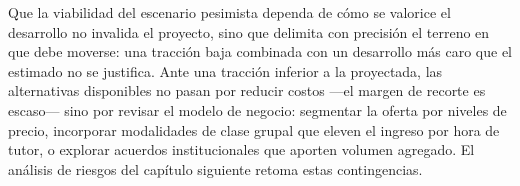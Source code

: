 Que la viabilidad del escenario pesimista dependa de cómo se valorice el
desarrollo no invalida el proyecto, sino que delimita con precisión el
terreno en que debe moverse: una tracción baja combinada con un
desarrollo más caro que el estimado no se justifica. Ante una
tracción inferior a la proyectada, las alternativas disponibles no pasan
por reducir costos —el margen de recorte es escaso— sino por revisar el
modelo de negocio: segmentar la oferta por niveles de precio, incorporar
modalidades de clase grupal que eleven el ingreso por hora de tutor, o
explorar acuerdos institucionales que aporten volumen agregado. El
análisis de riesgos del capítulo siguiente retoma estas contingencias.
